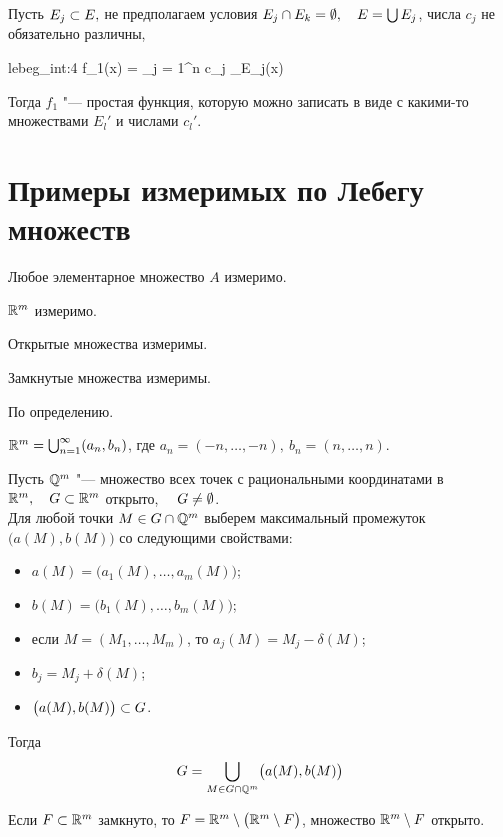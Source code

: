 \begin{remark}
	Пусть $ E_j \subset E, $ не предполагаем условия $ E_j \cap E_k = \emptyset, \quad E = \bigcup E_j $, числа $ c_j $ не обязательно различны,
	\begin{equ}{lebeg_int:4}
		f_1(x) = \sum_{j = 1}^n c_j \chi_{E_j}(x)
	\end{equ}

	Тогда $ f_1 $ "--- простая функция, которую можно записать в виде  с какими-то множествами $ E_l' $ и числами $ c_l' $.
\end{remark}

\section{Примеры измеримых по Лебегу множеств}

\begin{exmpls}
	\item Любое элементарное множество $ A $ измеримо.
	\item $ \mathbb{R}^m $ измеримо.
	\item Открытые множества измеримы.
	\item Замкнутые множества измеримы.
\end{exmpls}

\begin{eproof}
	\item По определению.

	\item $ \mathbb{R}^m = \bigcup_{n = 1}^\infty (a_n, b_n) $, где $ a_n = (-n, \dots, -n), ~ b_n = (n, \dots, n) $.

	\item Пусть $ \mathbb{Q}^m $ "--- множество всех точек с рациональными координатами в $ \mathbb{R}^m, \quad G \subset \mathbb{R}^m $ открыто, $ \quad G \ne \emptyset $. \\
		Для любой точки $ M \in G \cap \mathbb{Q}^m $ выберем максимальный промежуток $ \bigl( a(M), b(M) \bigr) $ со следующими свойствами:
		\begin{itemize}
			\item $ a(M) = \bigl( a_1(M), \dots, a_m(M) \bigr) $;
			\item $ b(M) = \bigl( b_1(M), \dots, b_m(M) \bigr) $;
			\item если $ M = (M_1, \dots, M_m) $, то $ a_j(M) = M_j - \delta(M) $;
			\item $ b_j = M_j + \delta(M) $;
			\item $ \bigl( a(M), b(M) \bigr) \subset G $.
		\end{itemize}
		Тогда
		$$ G = \bigcup_{M \in G \cap \mathbb{Q}^m} \bigl( a(M), b(M) \bigr) $$

	\item Если $ F \subset \mathbb{R}^m $ замкнуто, то $ F = \mathbb{R}^m \setminus \bigl( \mathbb{R}^m \setminus F \bigr) $, множество $ \mathbb{R}^m \setminus F $ открыто.
\end{eproof}

